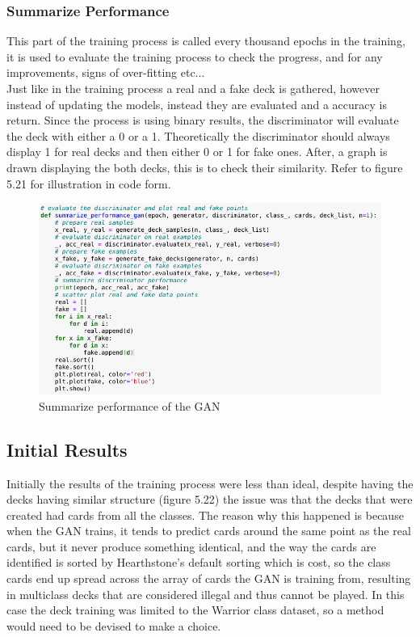 \documentclass{report} %
\begin{document}
\subsubsection{Summarize Performance}
This part of the training process is called every thousand epochs in the training, it is used to evaluate the training process to check the progress, and for any improvements, signs of over-fitting etc...\\ Just like in the training process a real and a fake deck is gathered, however instead of updating the models, instead they are evaluated and a accuracy is return. Since the process is using binary results, the discriminator will evaluate the deck with either a 0 or a 1. Theoretically the discriminator should always display 1 for real decks and then either 0 or 1 for fake ones. After, a graph is drawn displaying the both decks, this is to check their similarity. Refer to figure 5.21 for illustration in code form.

\begin{figure}[H]
\centering
\includegraphics[width=1.25\textwidth]{sumPer}
\caption{Summarize performance of the GAN\protect}
 \label{board}
\end{figure}
\subsection{Initial Results}

Initially the results of the training process were less than ideal, despite having the decks having similar structure (figure 5.22) the issue was that the decks that were created had cards from all the classes. The reason why this happened is because when the GAN trains, it tends to predict cards around the same point as the real cards, but it never produce something identical, and the way the cards are identified is sorted by Hearthstone's default sorting which is cost, so the class cards end up spread across the array of cards the GAN is training from, resulting in multiclass decks that are considered illegal and thus cannot be played. In this case the deck training was limited to the Warrior class dataset, so a method would need to be devised to make a choice.   
\end{document}

